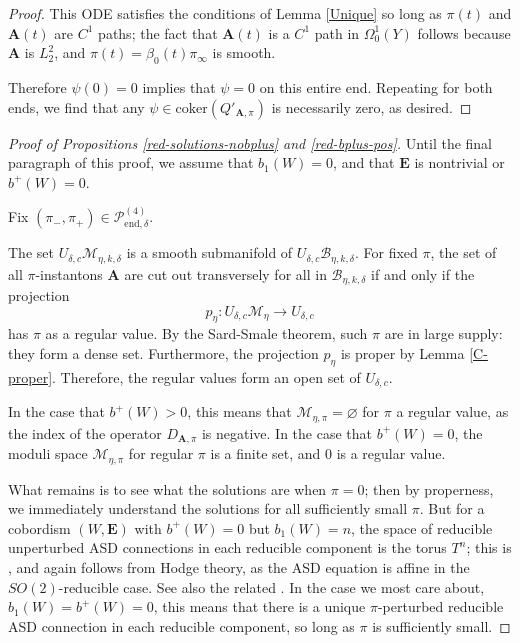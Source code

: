 \documentclass{memo-l}
\theoremstyle{definition}
\theoremstyle{remark}
\numberwithin{section}{chapter}
\numberwithin{equation}{chapter}
\begin{document}
\begin{proof}
This ODE satisfies the conditions of Lemma \ref{Unique} so long as $\pi(t)$ and $\mathbf{A}(t)$ are $C^1$ paths; the fact that $\mathbf{A}(t)$ is a $C^1$ path in $\Omega^1_0(Y)$ follows because $\mathbf{A}$ is $L^2_2$, and $\pi(t) = \beta_0(t) \pi_\infty$ is smooth.

Therefore $\psi(0) = 0$ implies that $\psi = 0$ on this entire end. Repeating for both ends, we find that any $\psi \in \text{coker}(Q'_{\mathbf{A},\pi})$ is necessarily zero, as desired.
\end{proof}

\begin{proof}[Proof of Propositions \ref{red-solutions-nobplus} and \ref{red-bplus-pos}]
Until the final paragraph of this proof, we assume that $b_1(W) = 0$, and that $\mathbf{E}$ is nontrivial or $b^+(W) = 0$.

Fix $(\pi_-, \pi_+) \in \mathcal P^{(4)}_{\text{end}, \delta}$.

The set $U_{\delta,c} \mathcal M_{\eta,k,\delta}$ is a smooth submanifold of $U_{\delta,c} \mathcal B_{\eta, k, \delta}$. For fixed $\pi$, the set of all $\pi$-instantons $\mathbf{A}$ are cut out transversely for all in $\mathcal B_{\eta, k, \delta}$ if and only if the projection
$$p_\eta: U_{\delta,c} \mathcal M_{\eta} \to U_{\delta,c}$$
has $\pi$ as a regular value. By the Sard-Smale theorem, such $\pi$ are in large supply: they form a dense set. Furthermore, the projection $p_\eta$ is proper by Lemma \ref{C-proper}. Therefore, the regular values form an open set of $U_{\delta,c}$.

In the case that $b^+(W) > 0$, this means that $\mathcal M_{\eta, \pi} = \varnothing$ for $\pi$ a regular value, as the index of the operator $D_{\mathbf{A},\pi}$ is negative. In the case that  $b^+(W) = 0$, the moduli space $\mathcal M_{\eta, \pi}$ for regular $\pi$ is a finite set, and $0$ is a regular value.

What remains is to see what the solutions are when $\pi = 0$; then by properness, we immediately understand the solutions for all sufficiently small $\pi$. But for a cobordism $(W,\mathbf{E})$ with $b^+(W) = 0$ but $b_1(W) = n$, the space of reducible unperturbed ASD connections in each reducible component is the torus $T^n$; this is \cite[Lemma~1.6]{Dae}, and again follows from Hodge theory, as the ASD equation is affine in the $SO(2)$-reducible case. See also the related \cite[Lemma~2]{Fr1}. In the case we most care about, $b_1(W) = b^+(W) = 0$, this means that there is a unique $\pi$-perturbed reducible ASD connection in each reducible component, so long as $\pi$ is sufficiently small.


\end{proof}
\end{document}
